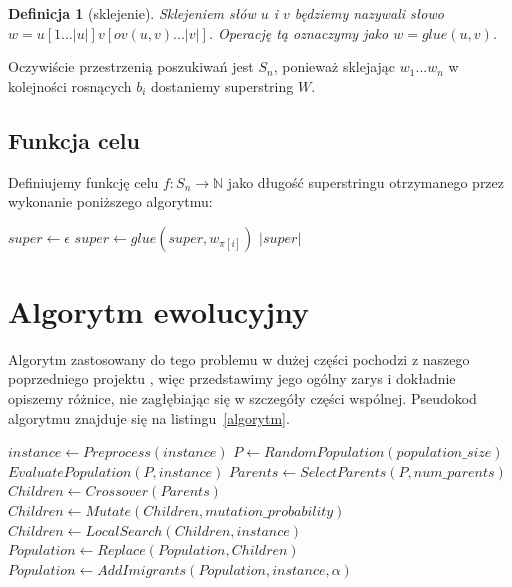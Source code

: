 \documentclass[11pt, a4wide]{mwart}
\newtheorem{definition}{Definicja}
\begin{document}
\begin{definition}[sklejenie]
Sklejeniem słów $u$ i $v$ będziemy nazywali słowo $w = u[1...|u|]v[ov(u, v) ... |v|]$.
Operację tą oznaczymy jako $w = glue(u, v)$.
\end{definition}

Oczywiście przestrzenią poszukiwań jest $S_n$, ponieważ sklejając $w_1 ... w_n$ w kolejności
rosnących $b_i$ dostaniemy superstring $W$. 

\subsection{Funkcja celu}
Definiujemy funkcję celu $f : S_n \rightarrow \mathbb{N}$ jako długość superstringu otrzymanego
przez wykonanie poniższego algorytmu:

\begin{algorithm}[H]
\caption{Definicja funkcji celu}
\label{funkcja celu}
\begin{algorithmic}
    \State $super \gets \epsilon$
    \State $super \gets glue(super, w_{\pi[i]})$
    \EndFor
    \State \Return $|super|$
  \EndFunction
\end{algorithmic}
\end{algorithm}




\section{Algorytm ewolucyjny}
Algorytm zastosowany do tego problemu w dużej części pochodzi z naszego 
poprzedniego projektu \cite{flowshop}, więc przedstawimy jego ogólny zarys
i dokładnie opiszemy różnice, nie zagłębiając się w szczegóły części wspólnej.
Pseudokod algorytmu znajduje się na listingu~\ref{algorytm}.

\begin{algorithm}[H]
\caption{Algorytm ewolucyjny dla problemu flow shop}
\label{algorytm}
\begin{algorithmic}
  \State $instance \gets Preprocess(instance)$
  \State $P \gets RandomPopulation(population\_size)$
  \State $EvaluatePopulation(P, instance)$
    \State $Parents \gets SelectParents(P, num\_parents)$ 
    \State $Children \gets Crossover(Parents)$
    \State $Children \gets Mutate(Children, mutation\_probability)$
    \State $Children \gets LocalSearch(Children, instance)$
    \State $Population \gets Replace(Population, Children)$
    \State $Population \gets AddImigrants(Population, instance, \alpha)$
  \EndWhile
\end{algorithmic}
\end{algorithm}
\end{document}
